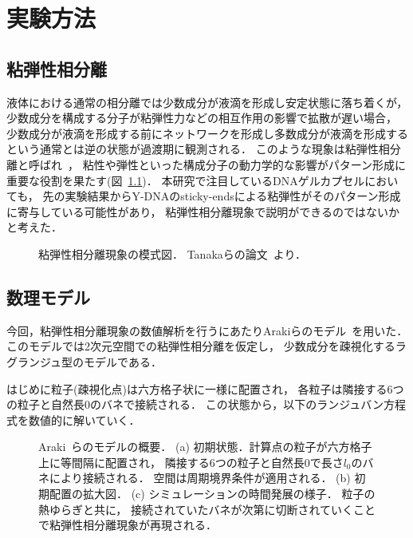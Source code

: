 \chapter{実験方法}

\section{粘弾性相分離}
液体における通常の相分離では少数成分が液滴を形成し安定状態に落ち着くが，
少数成分を構成する分子が粘弾性力などの相互作用の影響で拡散が遅い場合，
少数成分が液滴を形成する前にネットワークを形成し多数成分が液滴を形成するという通常とは逆の状態が過渡期に観測される．
このような現象は粘弾性相分離と呼ばれ~\cite{tanaka2009formation}，
粘性や弾性といった構成分子の動力学的な影響がパターン形成に重要な役割を果たす(図~\ref{fig:veps})．
本研究で注目しているDNAゲルカプセルにおいても，
先の実験結果からY-DNAのsticky-endsによる粘弾性がそのパターン形成に寄与している可能性があり，
粘弾性相分離現象で説明ができるのではないかと考えた．

\begin{figure}
\centering

\caption{
    粘弾性相分離現象の模式図．
    Tanakaらの論文~\cite{tanaka2009formation}より．
}

\label{fig:veps}
\end{figure}

\section{数理モデル}
今回，粘弾性相分離現象の数値解析を行うにあたりArakiらのモデル~\cite{araki2005simple}を用いた．
このモデルでは2次元空間での粘弾性相分離を仮定し，
少数成分を疎視化するラグランジュ型のモデルである．

はじめに粒子(疎視化点)は六方格子状に一様に配置され，
各粒子は隣接する6つの粒子と自然長$0$のバネで接続される．
この状態から，以下のランジュバン方程式を数値的に解いていく．


\begin{figure}
\centering

\caption{
    Araki~\cite{araki2005simple}らのモデルの概要．
    (a) 初期状態．計算点の粒子が六方格子上に等間隔に配置され，
        隣接する6つの粒子と自然長$0$で長さ$l_0$のバネにより接続される．
        空間は周期境界条件が適用される．
    (b) 初期配置の拡大図．
    (c) シミュレーションの時間発展の様子．
        粒子の熱ゆらぎと共に，
        接続されていたバネが次第に切断されていくことで粘弾性相分離現象が再現される．
}
\label{fig:model_2d}
\end{figure}


